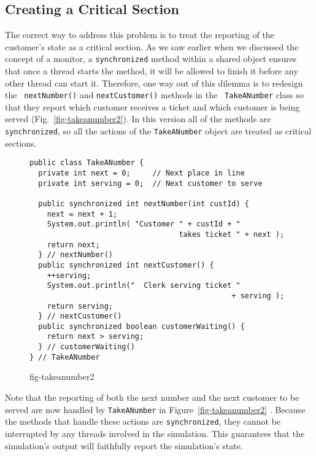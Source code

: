 \subsection*{Creating a Critical Section}
\noindent The correct way to address this problem is to treat the reporting of
the customer's state as a critical section.  As we saw earlier when we
discussed the concept of a monitor, a {\tt synchronized} method within
a shared object ensures that once a thread starts the method, it will
be allowed to finish it before any other thread can start
it.  Therefore, one way out of this dilemma is to redesign the {\tt
nextNumber()} and {\tt nextCustomer()} methods in the {\tt
TakeANumber} class so that they report which customer receives a
ticket and which customer is being served
(Fig.~\ref{fig-takeanumber2}).  In this version all of the methods are
{\tt synchronized}, so all the actions of the {\tt TakeANumber} object
are treated as critical sections.

\begin{figure}[h!]
\jjjprogstart
\begin{jjjlisting}
\begin{lstlisting}
public class TakeANumber {
  private int next = 0;     // Next place in line
  private int serving = 0;  // Next customer to serve

  public synchronized int nextNumber(int custId) {
    next = next + 1;
    System.out.println( "Customer " + custId + "
                                  takes ticket " + next );
    return next;
  } // nextNumber()
  public synchronized int nextCustomer() {
    ++serving;
    System.out.println("  Clerk serving ticket " 
                                              + serving );
    return serving;
  } // nextCustomer()
  public synchronized boolean customerWaiting() {
    return next > serving;
  } // customerWaiting()
} // TakeANumber
\end{lstlisting}
\end{jjjlisting}
{fig-takeanumber2}
\end{figure}


Note that the reporting of both the
next number and the next customer to be served are now handled by
{\tt TakeANumber} in Figure~\ref{fig-takeanumber2} . Because the methods that handle these actions are
{\tt synchronized}, they cannot be interrupted by any threads involved in
the simulation.  This guarantees that the simulation's output will
faithfully report the simulation's state.

